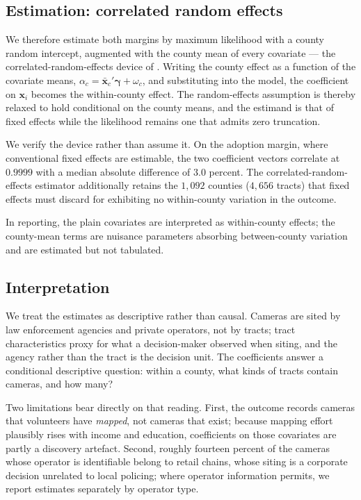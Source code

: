 \subsection{Estimation: correlated random effects}

We therefore estimate both margins by maximum likelihood with a county random
intercept, augmented with the county mean of every covariate --- the
correlated-random-effects device of \citet{Mundlak1978}. Writing the county
effect as a function of the covariate means,
$\alpha_c = \bar{\mathbf{x}}_c'\boldsymbol{\gamma} + \omega_c$, and substituting
into the model, the coefficient on $\mathbf{x}_i$ becomes the within-county
effect. The random-effects assumption is thereby relaxed to hold conditional on
the county means, and the estimand is that of fixed effects while the
likelihood remains one that admits zero truncation.

We verify the device rather than assume it. On the adoption margin, where
conventional fixed effects are estimable, the two coefficient vectors correlate
at $0.9999$ with a median absolute difference of $3.0$ percent. The
correlated-random-effects estimator additionally retains the $1{,}092$ counties
($4{,}656$ tracts) that fixed effects must discard for exhibiting no
within-county variation in the outcome.

In reporting, the plain covariates are interpreted as within-county effects;
the county-mean terms are nuisance parameters absorbing between-county
variation and are estimated but not tabulated.

\subsection{Interpretation}

We treat the estimates as descriptive rather than causal. Cameras are sited by
law enforcement agencies and private operators, not by tracts; tract
characteristics proxy for what a decision-maker observed when siting, and the
agency rather than the tract is the decision unit. The coefficients answer a
conditional descriptive question: within a county, what kinds of tracts contain
cameras, and how many?

Two limitations bear directly on that reading. First, the outcome records
cameras that volunteers have \emph{mapped}, not cameras that exist; because
mapping effort plausibly rises with income and education, coefficients on those
covariates are partly a discovery artefact. Second, roughly fourteen percent of
the cameras whose operator is identifiable belong to retail chains, whose
siting is a corporate decision unrelated to local policing; where operator
information permits, we report estimates separately by operator type.
